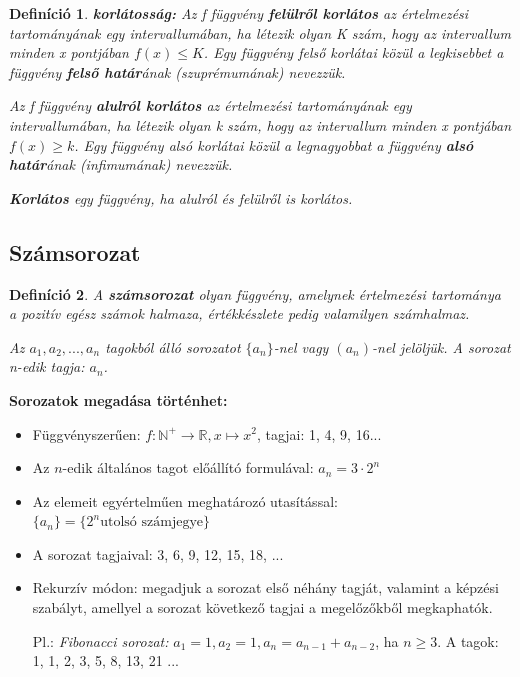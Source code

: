 \documentclass[12pt,a4paper]{article}
\newtheorem{definition}{Definíció} [section]
\begin{document}
\begin{definition}
\textbf{korlátosság:} Az f függvény \textbf{felülről korlátos} az értelmezési tartományának egy intervallumában, ha létezik olyan K szám, hogy az intervallum minden x pontjában $f(x) \leq K$. Egy függvény felső korlátai közül a legkisebbet a függvény \textbf{felső határ}ának (szuprémumának) nevezzük.

Az f függvény \textbf{alulról korlátos} az értelmezési tartományának egy intervallumában, ha létezik olyan k szám, hogy az intervallum minden x pontjában $f(x) \geq k$. Egy függvény alsó korlátai közül a legnagyobbat a függvény \textbf{alsó határ}ának (infimumának) nevezzük.

\textbf{Korlátos} egy függvény, ha alulról és felülről is korlátos.
\end{definition}

\subsection{Számsorozat}
\begin{definition}
A \textbf{számsorozat} olyan függvény, amelynek értelmezési tartománya a pozitív egész számok halmaza, értékkészlete pedig valamilyen számhalmaz.

Az $a_1, a_2, ..., a_n$ tagokból álló sorozatot $\{a_n\}$-nel vagy $(a_n)$-nel jelöljük. A sorozat n-edik tagja: $a_n$.
\end{definition}

\textbf{Sorozatok megadása történhet:}

\begin{itemize}
\item Függvényszerűen: $f: \mathbb{N}^+ \rightarrow \mathbb{R}, x \mapsto x^2$, tagjai: 1, 4, 9, 16...
\item Az $n$-edik általános tagot előállító formulával: $a_n = 3 \cdot 2^n$
\item Az elemeit egyértelműen meghatározó utasítással: $\{a_n\} = \{2^n \text{utolsó számjegye}\}$
\item A sorozat tagjaival: 3, 6, 9, 12, 15, 18, ...
\item Rekurzív módon: megadjuk a sorozat első néhány tagját, valamint a képzési szabályt, amellyel a sorozat következő tagjai a megelőzőkből megkaphatók.

Pl.: \textit{Fibonacci sorozat:} $a_1 = 1, a_2 = 1, a_n = a_{n - 1} + a_{n - 2}$, ha $n\geq 3$. A tagok: 1, 1, 2, 3, 5, 8, 13, 21 ...
\end{itemize}
\end{document}
